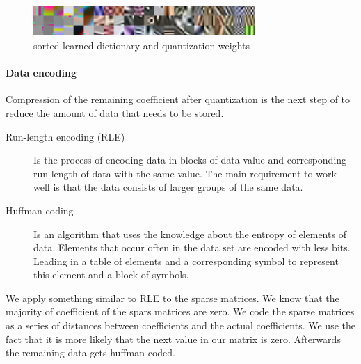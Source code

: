 \begin{figure}[h]
\centering
\includegraphics[width = 0.75\textwidth]{images/sorted.png}
\caption{sorted learned dictionary and quantization weights}
\label{fig:sorted}
\end{figure}

\paragraph{Data encoding}
Compression of the remaining coefficient after quantization is the next step
of to reduce the amount of data that needs to be stored.
\begin{description}
 \item[Run-length encoding (RLE)] Is the process of encoding data in blocks of
data value and corresponding run-length of data with the same value. The main
requirement to work well is that the data consists of larger groups of the same
data.
  \item[Huffman coding] Is an algorithm that uses the knowledge about the
entropy of elements of data. Elements that occur often in the data set are
encoded with less bits. Leading in a table of elements and a corresponding
symbol to represent this element and a block of symbols.
\end{description}

We apply something similar to RLE to the sparse matrices. We know that the
majority of coefficient of the spars matrices are zero. We code the sparse
matrices as a series of distances between coefficients and the actual
coefficients. We use the fact that it is more likely that the next value in our
matrix is zero. Afterwards the remaining data gets huffman coded. 


